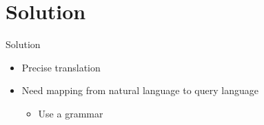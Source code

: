 \section{Solution} 
\begin{frame}{Solution} \pause
  \begin{itemize}
    \item Precise translation \pause
    \item Need mapping from natural language to query language \pause
      \begin{itemize}
        \item Use a grammar
      \end{itemize}
  \end{itemize}
  
\end{frame}

